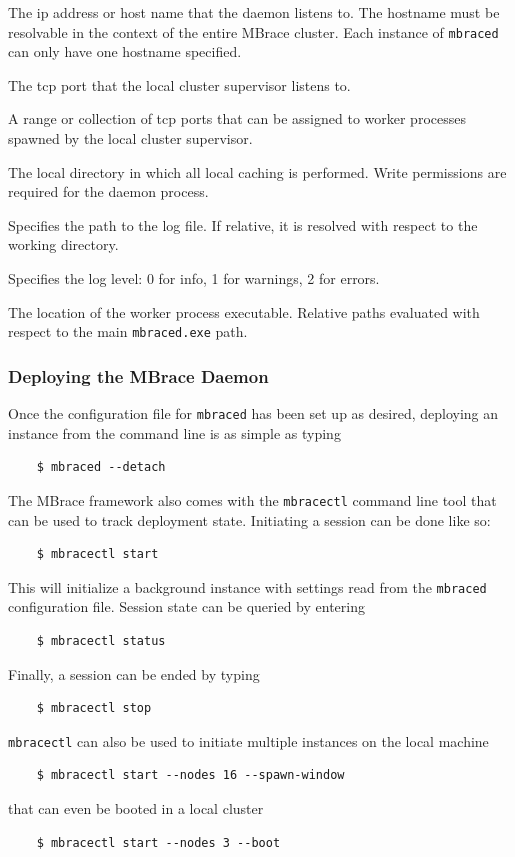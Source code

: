 \documentclass[9pt,a4paper]{article}
\newcommand{\mbrace}{MBrace}
\newcommand{\TitularMbrace}{MBrace}
\begin{document}
\begin{description}[style=unboxed, font=\sffamily]
\item[Hostname] The ip address or host name that the daemon listens to.
The hostname must be resolvable in the context of the entire \mbrace{} cluster.
Each instance of \texttt{mbraced} can only have one hostname specified.
\item[Primary Port] The tcp port that the local cluster supervisor listens to.
\item[Worker Port Range] A range or collection of tcp ports that can be assigned
to worker processes spawned by the local cluster supervisor.
\item[Working Directory] The local directory in which all local caching is performed.
Write permissions are required for the daemon process.
\item[Log File] Specifies the path to the log file. If relative, it is resolved with
respect to the working directory.
\item[Log Level] Specifies the log level: 0 for info, 1 for warnings, 2 for errors.
\item[ProcessDomain Executable] The location of the worker process executable.
Relative paths evaluated with respect to the main \texttt{mbraced.exe} path.
\end{description}

\subsubsection*{Deploying the \TitularMbrace{} Daemon}

Once the configuration file for \texttt{mbraced} has been set up as desired,
deploying an instance from the command line is as simple as typing
\begin{verbatim}
    $ mbraced --detach
\end{verbatim}
The \mbrace{} framework also comes with the \texttt{mbracectl} command line tool
that can be used to track deployment state. Initiating a session can be done like so:
\begin{verbatim}
    $ mbracectl start
\end{verbatim}
This will initialize a background instance with settings read from the \texttt{mbraced}
configuration file. Session state can be queried by entering
\begin{verbatim}
    $ mbracectl status
\end{verbatim}
Finally, a session can be ended by typing
\begin{verbatim}
    $ mbracectl stop
\end{verbatim}
\texttt{mbracectl} can also be used to initiate multiple instances on the local machine
\begin{verbatim}
    $ mbracectl start --nodes 16 --spawn-window
\end{verbatim}
that can even be booted in a local cluster
\begin{verbatim}
    $ mbracectl start --nodes 3 --boot
\end{verbatim}
\end{document}

